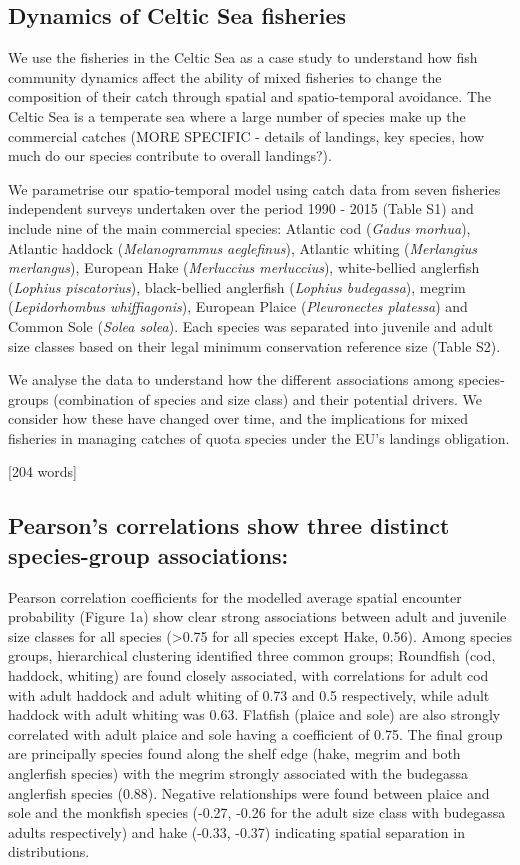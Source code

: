 \documentclass{nature}
\begin{document}
\begin{linenumbers}
[182 words]

\subsection{Dynamics of Celtic Sea fisheries}

We use the fisheries in the Celtic Sea as a case study to understand how fish
community dynamics affect the ability of mixed fisheries to change the
composition of their catch through spatial and spatio-temporal avoidance. The
Celtic Sea is a temperate sea where a large number of species make up the
commercial catches (MORE SPECIFIC - details of landings, key species, how much
do our species contribute to overall landings?).

We parametrise our spatio-temporal model using catch data from seven fisheries
independent surveys undertaken over the period 1990 - 2015 (Table S1) and
include nine of the main commercial species: Atlantic cod (\textit{Gadus
	morhua}), Atlantic haddock (\textit{Melanogrammus aeglefinus}),
Atlantic whiting (\textit{Merlangius merlangus}), European
Hake (\textit{Merluccius merluccius}), white-bellied anglerfish (\textit{Lophius
	piscatorius}), black-bellied anglerfish (\textit{Lophius budegassa}),
megrim (\textit{Lepidorhombus whiffiagonis}), European Plaice
(\textit{Pleuronectes platessa}) and Common Sole (\textit{Solea solea}).  Each
species was separated into juvenile and adult size classes based on their legal
minimum conservation reference size (Table S2).

We analyse the data to understand how the different associations among
species-groups (combination of species and size class) and their potential
drivers. We consider how these have changed over time, and the implications for
mixed fisheries in managing catches of quota species under the EU's landings
obligation.

[204 words]

\subsection{Pearson's correlations show three distinct species-group
	associations:} 
Pearson correlation coefficients for the modelled average spatial encounter
probability (Figure 1a) show clear strong associations between adult and
juvenile size classes for all species (\textgreater 0.75 for all species except
Hake, 0.56).  Among species groups, hierarchical clustering identified three
common groups; Roundfish (cod, haddock, whiting) are found closely associated,
with correlations for adult cod with adult haddock and adult whiting of 0.73
and 0.5 respectively, while adult haddock with adult whiting was 0.63. Flatfish
(plaice and sole) are also strongly correlated with adult plaice and sole
having a coefficient of 0.75.  The final group are principally species found
along the shelf edge (hake, megrim and both anglerfish species) with the megrim
strongly associated with the budegassa anglerfish species (0.88). Negative
relationships were found between plaice and sole and the monkfish species
(-0.27, -0.26 for the adult size class with budegassa adults respectively) and
hake (-0.33, -0.37) indicating spatial separation in distributions.


\end{linenumbers}
\end{document}
